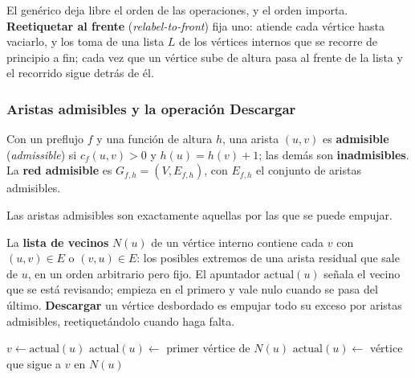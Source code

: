 \documentclass[11pt,letterpaper]{article}
\begin{document}
El genérico deja libre el orden de las operaciones, y el orden importa.
\textbf{Reetiquetar al frente} (\textit{relabel-to-front}) fija uno:
atiende cada vértice hasta vaciarlo, y los toma de una lista $L$ de
los vértices internos que se recorre de principio a fin; cada vez que
un vértice sube de altura pasa al frente de la lista y el recorrido
sigue detrás de él.

\subsubsection*{Aristas admisibles y la operación Descargar}

\begin{definicion}
  \label{def:arista-admisible}
  Con un preflujo $f$ y una función de altura $h$, una arista $(u, v)$
  es \textbf{admisible} (\textit{admissible}) si $c_f(u, v) > 0$ y
  $h(u) = h(v) + 1$; las demás son \textbf{inadmisibles}. La
  \textbf{red admisible} es $G_{f,h} = (V, E_{f,h})$, con $E_{f,h}$ el
  conjunto de aristas admisibles.
\end{definicion}

Las aristas admisibles son exactamente aquellas por las que se puede
empujar.

La \textbf{lista de vecinos} $N(u)$ de un vértice interno contiene
cada $v$ con $(u, v) \in E$ o $(v, u) \in E$: los posibles extremos de
una arista residual que sale de $u$, en un orden arbitrario pero
fijo. El apuntador $\text{actual}(u)$ señala el vecino que se está
revisando; empieza en el primero y vale nulo cuando se pasa del
último. \textbf{Descargar} un vértice desbordado es empujar todo su
exceso por aristas admisibles, reetiquetándolo cuando haga falta.

\begin{algorithm}[H]
\caption{\textsc{Descargar}$(u)$ \ (\textsc{Discharge} en Cormen)}
\label{alg:descargar}
\begin{algorithmic}[1]
    \State $v \gets \text{actual}(u)$
     
      \State {}
      \State $\text{actual}(u) \gets$ primer vértice de $N(u)$
      \State {} 
    \Else
      \State $\text{actual}(u) \gets$ vértice que sigue a $v$ en $N(u)$
    \EndIf
  \EndWhile
\EndProcedure
\end{algorithmic}
\end{algorithm}
\end{document}
